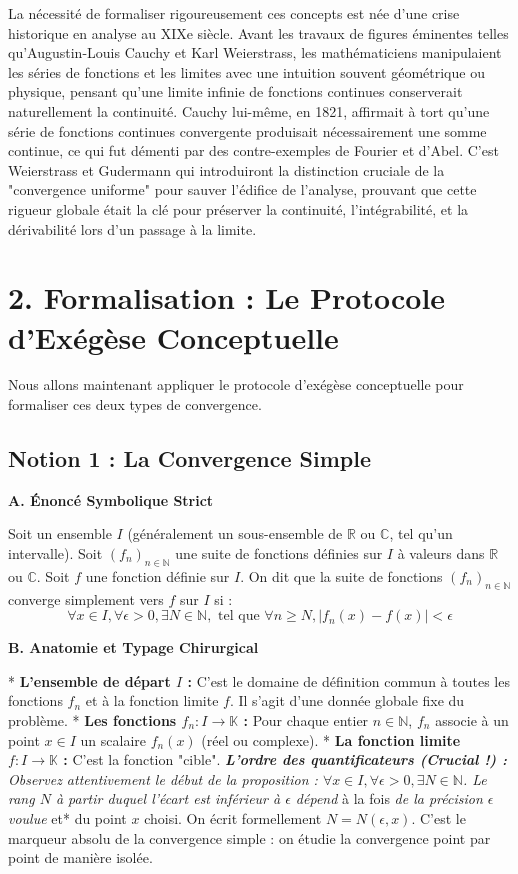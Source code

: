 \documentclass{report}
\begin{document}
La nécessité de formaliser rigoureusement ces concepts est née d'une crise historique en analyse au XIXe siècle. Avant les travaux de figures éminentes telles qu'Augustin-Louis Cauchy et Karl Weierstrass, les mathématiciens manipulaient les séries de fonctions et les limites avec une intuition souvent géométrique ou physique, pensant qu'une limite infinie de fonctions continues conserverait naturellement la continuité. Cauchy lui-même, en 1821, affirmait à tort qu'une série de fonctions continues convergente produisait nécessairement une somme continue, ce qui fut démenti par des contre-exemples de Fourier et d'Abel. C'est Weierstrass et Gudermann qui introduiront la distinction cruciale de la "convergence uniforme" pour sauver l'édifice de l'analyse, prouvant que cette rigueur globale était la clé pour préserver la continuité, l'intégrabilité, et la dérivabilité lors d'un passage à la limite.

\section*{2. Formalisation : Le Protocole d'Exégèse Conceptuelle}

Nous allons maintenant appliquer le protocole d'exégèse conceptuelle pour formaliser ces deux types de convergence.

\subsection*{Notion 1 : La Convergence Simple}

\textbf{A. Énoncé Symbolique Strict}

Soit un ensemble $I$ (généralement un sous-ensemble de $\mathbb{R}$ ou $\mathbb{C}$, tel qu'un intervalle). Soit $(f_n)_{n \in \mathbb{N}}$ une suite de fonctions définies sur $I$ à valeurs dans $\mathbb{R}$ ou $\mathbb{C}$. Soit $f$ une fonction définie sur $I$.
On dit que la suite de fonctions $(f_n)_{n \in \mathbb{N}}$ converge simplement vers $f$ sur $I$ si :
$$ \forall x \in I, \forall \epsilon > 0, \exists N \in \mathbb{N}, \text{ tel que } \forall n \ge N, |f_n(x) - f(x)| < \epsilon $$

\textbf{B. Anatomie et Typage Chirurgical}

*   \textbf{L'ensemble de départ $I$ :} C'est le domaine de définition commun à toutes les fonctions $f_n$ et à la fonction limite $f$. Il s'agit d'une donnée globale fixe du problème.
*   \textbf{Les fonctions $f_n : I \to \mathbb{K}$ :} Pour chaque entier $n \in \mathbb{N}$, $f_n$ associe à un point $x \in I$ un scalaire $f_n(x)$ (réel ou complexe).
*   \textbf{La fonction limite $f : I \to \mathbb{K}$ :} C'est la fonction "cible".
\textit{   \textbf{L'ordre des quantificateurs (Crucial !) :} Observez attentivement le début de la proposition : $\forall x \in I, \forall \epsilon > 0, \exists N \in \mathbb{N}$. Le rang $N$ à partir duquel l'écart est inférieur à $\epsilon$ dépend }à la fois\textit{ de la précision $\epsilon$ voulue }et* du point $x$ choisi. On écrit formellement $N = N(\epsilon, x)$. C'est le marqueur absolu de la convergence simple : on étudie la convergence point par point de manière isolée.
\end{document}
